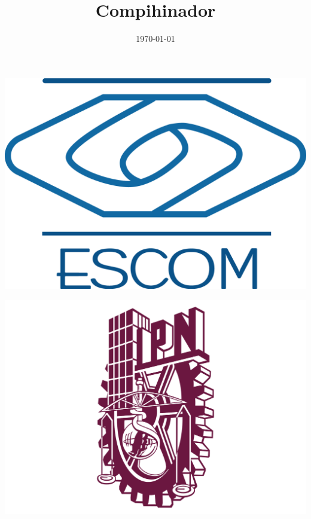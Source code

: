 \documentclass[10pt,executivepaper]{article}
\title{Compihinador}
\author{}
\date{\today}
\begin{document}
\begin{minipage}{0.4\textwidth}
	\begin{flushleft}
		\includegraphics[scale = 0.05]{imgs/logoescom.png}
	\end{flushleft}
\end{minipage}
\begin{minipage}{0.51\textwidth}
	\begin{flushright}
		\includegraphics[scale = 0.055]{imgs/logoipn.png}
	\end{flushright}
\end{minipage}
\end{document}
